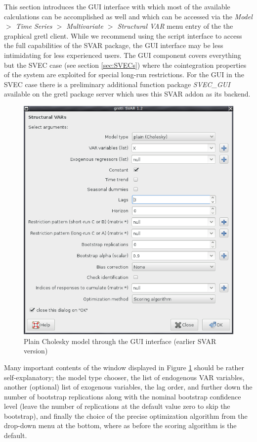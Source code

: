 \documentclass[a4paper,10pt]{article}
\newcommand{\app}[1]{\textsf{#1}}
\newcounter{script}[section]
\begin{document}
This section introduces the GUI interface with which most of the
available calculations can be accomplished as well and which can be
accessed via the \emph{Model $>$ Time Series $>$ Multivariate $>$ 
Structural VAR}
menu entry of the the graphical \app{gretl} client.  While we recommend
using the script interface to access the full capabilities of the SVAR
package, the GUI interface may be less intimidating for less
experienced users. The GUI component covers everything but the SVEC case 
(see section \ref{sec:SVECs}) where the cointegration properties of the 
system are exploited for special long-run restrictions. For the GUI in
the SVEC case there is a preliminary additional function package 
\emph{SVEC\_GUI} available on the gretl package server which uses this
SVAR addon as its backend. 

\begin{figure}[htbp]
  \centering
  \includegraphics[scale=0.5]{GUI_SVAR.png}
  \caption{Plain Cholesky model through the GUI interface (earlier SVAR version)}
  \label{fig:GUI-plain}
\end{figure}


Many important contents of the window displayed in Figure
\ref{fig:GUI-plain} should be rather self-explanatory; the model type
chooser, the list of endogenous VAR variables, another (optional) list
of exogenous variables, the lag order, and further down the number of
bootstrap replications along with the nominal bootstrap confidence
level (leave the number of replications at the default value zero to
skip the bootstrap), and finally the choice of the precise
optimization algorithm from the drop-down menu at the bottom, where as
before the scoring algorithm is the default.
\end{document}
